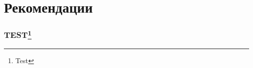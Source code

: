 \section{Рекомендации}

\begin{frame}
    \frametitle{TEST\footnote{Test}}
    \begin{center}
        
    \end{center}
\end{frame}